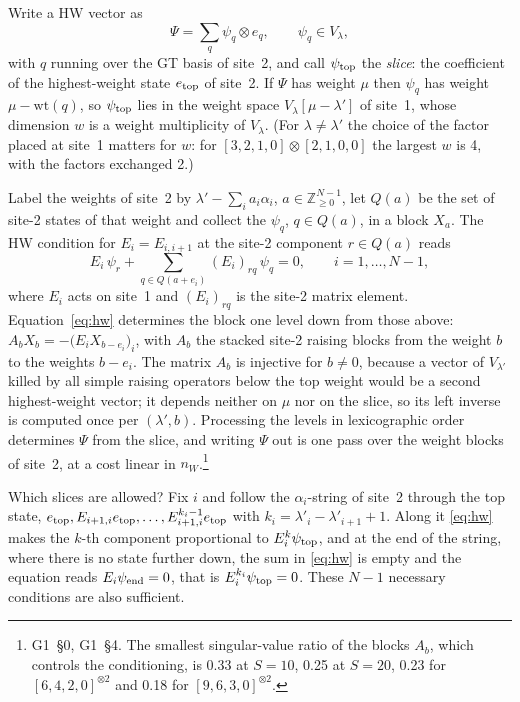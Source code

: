 \documentclass[11pt]{article}
\makeatletter
\renewcommand\subsection{\@startsection{subsection}{2}{\z@}{-2.0ex \@plus -1ex \@minus -.2ex}{0.6ex \@plus .2ex}{\normalfont\normalsize\bfseries}}
\newcommand{\rg}[2]{\textsf{G#1}~\S#2}
\makeatother
\begin{document}
Write a HW vector as
\begin{equation}\label{eq:slice}
\Psi=\sum_q\psi_q\otimes e_q,\qquad\psi_q\in V_\lambda,
\end{equation}
with $q$ running over the GT basis of site~2, and call $\psi_{\rm top}$ the \emph{slice}: the coefficient of the highest-weight state $e_{\rm top}$ of site~2.
If $\Psi$ has weight $\mu$ then $\psi_q$ has weight $\mu-\mathrm{wt}(q)$, so $\psi_{\rm top}$ lies in the weight space $V_\lambda[\mu-\lambda']$ of site~1, whose dimension $w$ is a weight multiplicity of $V_\lambda$.
(For $\lambda\ne\lambda'$ the choice of the factor placed at site~1 matters for $w$: for $[3,2,1,0]\otimes[2,1,0,0]$ the largest $w$ is 4, with the factors exchanged 2.)

Label the weights of site~2 by $\lambda'-\sum_ia_i\alpha_i$, $a\in\mathbb{Z}_{\ge0}^{N-1}$, let $Q(a)$ be the set of site-2 states of that weight and collect the $\psi_q$, $q\in Q(a)$, in a block $X_a$.
The HW condition for $E_i=E_{i,i+1}$ at the site-2 component $r\in Q(a)$ reads
\begin{equation}\label{eq:hw}
E_i\,\psi_r+\sum_{q\in Q(a+e_i)}(E_i)_{rq}\,\psi_q=0,\qquad i=1,\dots,N-1,
\end{equation}
where $E_i$ acts on site~1 and $(E_i)_{rq}$ is the site-2 matrix element.
Equation~\eqref{eq:hw} determines the block one level down from those above: $A_bX_b=-\big(E_iX_{b-e_i}\big)_i$, with $A_b$ the stacked site-2 raising blocks from the weight $b$ to the weights $b-e_i$.
The matrix $A_b$ is injective for $b\ne0$, because a vector of $V_{\lambda'}$ killed by all simple raising operators below the top weight would be a second highest-weight vector; it depends neither on $\mu$ nor on the slice, so its left inverse is computed once per $(\lambda',b)$.
Processing the levels in lexicographic order determines $\Psi$ from the slice, and writing $\Psi$ out is one pass over the weight blocks of site~2, at a cost linear in $n_W$.\footnote{\rg{1}{0}, \rg{1}{4}. The smallest singular-value ratio of the blocks $A_b$, which controls the conditioning, is 0.33 at $S=10$, 0.25 at $S=20$, 0.23 for $[6,4,2,0]^{\otimes2}$ and 0.18 for $[9,6,3,0]^{\otimes2}$.}

\subsection{The theorem}\label{sec:theorem}

Which slices are allowed?
Fix $i$ and follow the $\alpha_i$-string of site~2 through the top state, $e_{\rm top},E_{i+1,i}e_{\rm top},\dots,E_{i+1,i}^{k_i-1}e_{\rm top}$ with $k_i=\lambda'_i-\lambda'_{i+1}+1$.
Along it \eqref{eq:hw} makes the $k$-th component proportional to $E_i^k\psi_{\rm top}$, and at the end of the string, where there is no state further down, the sum in \eqref{eq:hw} is empty and the equation reads $E_i\psi_{\rm end}=0$, that is $E_i^{k_i}\psi_{\rm top}=0$.
These $N-1$ necessary conditions are also sufficient.
\end{document}
